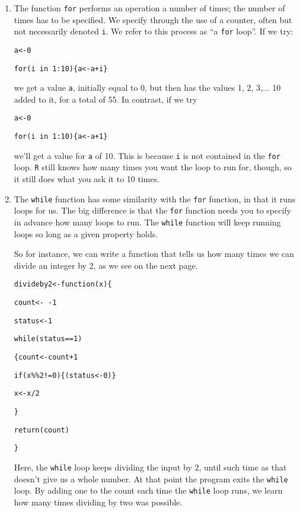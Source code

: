 \documentclass[11pt,a4paper]{article}
\begin{document}
\begin{enumerate}

\item The function \texttt{for} performs an operation a number of times; the number of times has to be specified. We specify through the use of a counter, often but not necessarily denoted \texttt{i}. We refer to this process as ``a \texttt{for} loop''. If we try:


\texttt{a<-0}

\texttt{for(i in 1:10)\{a<-a+i\}}

we get a value \texttt{a}, initially equal to 0, but then has the values 1, 2, 3,... 10 added to it, for a total of 55. In contrast, if we try

\texttt{a<-0}

\texttt{for(i in 1:10)\{a<-a+1\}}

we'll get a value for \texttt{a} of 10. This is because \texttt{i} is not contained in the \texttt{for} loop. \texttt{R} still knows how many times you want the loop to run for, though, so it still does what you ask it to 10 times.

\item The \texttt{while} function has some similarity with the \texttt{for} function, in that it runs loops for us. The big difference is that the \texttt{for}
function needs you to specify in advance how many loops to run. The \texttt{while} function will keep running loops so long as a given property holds.

So for instance, we can write a function that tells us how many times we can divide an integer by 2, as we see on the next page.

\newpage

\texttt{divideby2<-function(x)\{}

\texttt{count<- -1}

\texttt{status<-1}

\texttt{while(status==1)}

\texttt{\{count<-count+1}

\texttt{if(x\%\%2!=0)\{(status<-0)\}}

\texttt{x<-x/2}

\texttt{\}}

\texttt{return(count)}

\texttt{\}}

Here, the \texttt{while} loop keeps dividing the input by 2, until such time as that doesn't give us a whole number. At that point the program exits the \texttt{while} loop. By adding one to the count each time the \texttt{while} loop runs, we learn how many times dividing by two was possible.

\end{enumerate}
\end{document}
